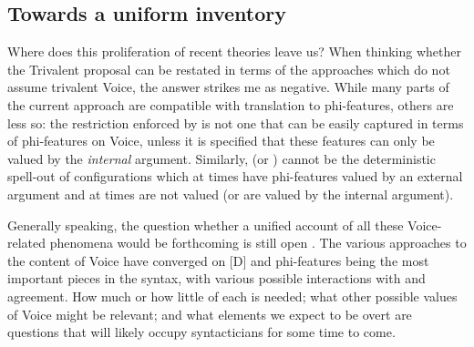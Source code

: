\begin{exe}
\begin{xlist}
\begin{xlist}
\begin{xlist}
\begin{xlist}
\begin{xlist}
\begin{xlist}
\begin{exe}
\begin{xlist}
\begin{exe}
\begin{exe}
\begin{xlist}
\begin{exe}
\begin{exe}
\begin{xlist}
\begin{exe}
\begin{xlist}
\begin{exe}
\begin{xlist}
\begin{exe}
\begin{xlist}
\begin{exe}
\begin{xlist}
\begin{exe}
\begin{xlist}
\begin{exe}
\begin{xlist}
\begin{exe}
\begin{xlist}
\begin{exe}
\begin{xlist}
\begin{exe}
\begin{xlist}
\begin{exe}
\begin{xlist}
	\subsection{Towards a uniform inventory}
Where does this proliferation of recent theories leave us? When thinking whether the Trivalent proposal can be restated in terms of the approaches which do not assume trivalent Voice, the answer strikes me as negative. While many parts of the current approach are compatible with translation to phi-features, others are less so: the restriction enforced by {\vz} is not one that can be easily captured in terms of phi-features on Voice, unless it is specified that these features can only be valued by the \emph{internal} argument. Similarly,  (or {\tkal}) cannot be the deterministic spell-out of configurations which at times have phi-features valued by an external argument and at times are not valued (or are valued by the internal argument).

Generally speaking, the question whether a unified account of all these Voice-related phenomena would be forthcoming is still open \citep[191ff12]{wurmbrandshimamura17}. The various approaches to the content of Voice have converged on [D] and phi-features being the most important pieces in the syntax, with various possible interactions with  and agreement. How much or how little of each is needed; what other possible values of Voice might be relevant; and what elements we expect to be overt are questions that will likely occupy syntacticians for some time to come.



\end{xlist}
\end{exe}
\end{xlist}
\end{exe}
\end{xlist}
\end{exe}
\end{xlist}
\end{exe}
\end{xlist}
\end{exe}
\end{xlist}
\end{exe}
\end{xlist}
\end{exe}
\end{xlist}
\end{exe}
\end{xlist}
\end{exe}
\end{xlist}
\end{exe}
\end{xlist}
\end{exe}
\end{exe}
\end{xlist}
\end{exe}
\end{exe}
\end{xlist}
\end{exe}
\end{xlist}
\end{xlist}
\end{xlist}
\end{xlist}
\end{xlist}
\end{xlist}
\end{exe}
